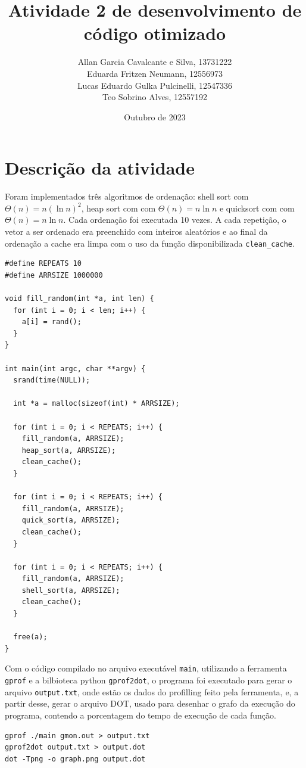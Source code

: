\documentclass{article}
\title{Atividade 2 de desenvolvimento de código otimizado}
\author{Allan Garcia Cavalcante e Silva, 13731222\\Eduarda Fritzen Neumann, 12556973\\Lucas Eduardo Gulka Pulcinelli, 12547336\\Teo Sobrino Alves, 12557192}
\date{Outubro de 2023}
\begin{document}
\maketitle

\section{Descrição da atividade}
Foram implementados três algoritmos de ordenação: shell sort com $\Theta(n) = n (\ln n)^2$, heap sort com com $\Theta(n) = n \ln n$ e quicksort com com $\Theta(n) = n \ln n$. Cada ordenação foi executada 10 vezes. A cada repetição, o vetor a ser ordenado era preenchido com inteiros aleatórios e ao final da ordenação a cache era limpa com o uso da função disponibilizada \texttt{clean\_cache}.


\begin{verbatim}
#define REPEATS 10
#define ARRSIZE 1000000

void fill_random(int *a, int len) {
  for (int i = 0; i < len; i++) {
    a[i] = rand();
  }
}

int main(int argc, char **argv) {
  srand(time(NULL));

  int *a = malloc(sizeof(int) * ARRSIZE);

  for (int i = 0; i < REPEATS; i++) {
    fill_random(a, ARRSIZE);
    heap_sort(a, ARRSIZE);
    clean_cache();
  }

  for (int i = 0; i < REPEATS; i++) {
    fill_random(a, ARRSIZE);
    quick_sort(a, ARRSIZE);
    clean_cache();
  }

  for (int i = 0; i < REPEATS; i++) {
    fill_random(a, ARRSIZE);
    shell_sort(a, ARRSIZE);
    clean_cache();
  }

  free(a);
}
\end{verbatim}

Com o código compilado no arquivo executável \texttt{main}, utilizando a ferramenta \texttt{gprof} e a bilbioteca python \texttt{gprof2dot}, o programa foi executado para gerar o arquivo \texttt{output.txt}, onde estão os dados do profilling feito pela ferramenta, e, a partir desse, gerar o arquivo DOT, usado para desenhar o grafo da execução do programa, contendo a porcentagem do tempo de execução de cada função. 

\begin{verbatim}
gprof ./main gmon.out > output.txt
gprof2dot output.txt > output.dot
dot -Tpng -o graph.png output.dot
\end{verbatim}
\end{document}
